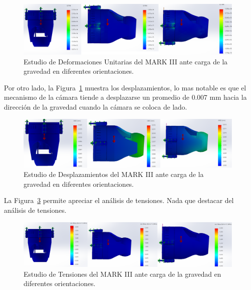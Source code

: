     \begin{figure}[H]
    \centering
    \begin{adjustbox}{width=\linewidth} \includegraphics{media/analisisEstatico/deformacionesUnitarias123.png}
    \end{adjustbox}
    \caption{\label{fig:deformaciones_unitarias}Estudio de Deformaciones Unitarias del MARK III ante carga de la gravedad en diferentes orientaciones.}
    \end{figure} 

    Por otro lado, la Figura~\ref{fig:deformaciones_unitarias} muestra los desplazamientos, lo mas notable es que el mecanismo de la cámara tiende a desplazarse un promedio de 0.007 mm hacia la dirección de la gravedad cuando la cámara se coloca de lado.

    \begin{figure}[H]
    \centering
    \begin{adjustbox}{width=\linewidth} \includegraphics{media/analisisEstatico/desplazamientos123.png}
    \end{adjustbox}
    \caption{\label{fig:analisisDesplazamientos}Estudio de Desplazamientos del MARK III ante carga de la gravedad en diferentes orientaciones.}
    \end{figure} 

    La Figura~\ref{fig:analisisTensiones} permite apreciar el análisis de tensiones. Nada que destacar del análisis de tensiones.

    \begin{figure}[H]
    \centering
    \begin{adjustbox}{width=\linewidth} \includegraphics{media/analisisEstatico/tensiones123.png}
    \end{adjustbox}
    \caption{\label{fig:analisisTensiones}Estudio de Tensiones del MARK III ante carga de la gravedad en diferentes orientaciones.}
    \end{figure} 

